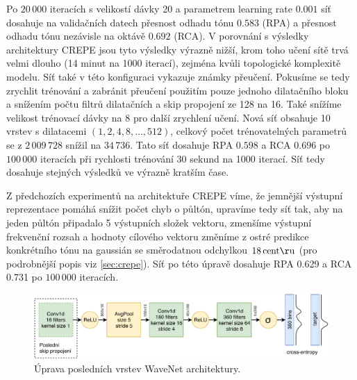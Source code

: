 Po $20\,000$ iteracích s velikostí dávky 20 a parametrem learning rate $0.001$ síť dosahuje na validačních datech přesnost odhadu tónu $0.583$ (RPA) a přesnost odhadu tónu nezávisle na oktávě $0.692$ (RCA). V porovnání s výsledky architektury CREPE jsou tyto výsledky výrazně nižší, krom toho učení sítě trvá velmi dlouho (14 minut na 1000 iterací), zejména kvůli topologické komplexitě modelu. Síť také v této konfiguraci vykazuje známky přeučení. Pokusíme se tedy zrychlit trénování a zabránit přeučení použitím pouze jednoho dilatačního bloku a snížením počtu filtrů dilatačních a skip propojení ze 128 na 16. Také snížíme velikost trénovací dávky na 8 pro další zrychlení učení. Nová síť obsahuje 10 vrstev s dilatacemi $(1, 2, 4, 8, \dots, 512)$, celkový počet trénovatelných parametrů se z $2\,009\,728$ snížil na $34\,736$. Tato síť dosahuje RPA $0.598$ a RCA $0.696$ po $100\,000$ iteracích při rychlosti trénování 30 sekund na 1000 iterací. Síť tedy dosahuje stejných výsledků ve výrazně kratším čase.

Z předchozích experimentů na architektuře CREPE víme, že jemnější výstupní reprezentace pomáhá snížit počet chyb o půltón, upravíme tedy síť tak, aby na jeden půltón připadalo 5 výstupních složek vektoru, zmenšíme výstupní frekvenční rozsah a hodnoty cílového vektoru změníme z ostré predikce konkrétního tónu na  gaussián se směrodatnou odchylkou $18\,\rm centů$ (pro podrobnější popis viz \ref{sec:crepe}). Síť po této úpravě dosahuje RPA 0.629 a RCA 0.731 po $100\,000$ iteracích. 

\begin{figure}[h]\centering
    \includegraphics[scale=0.8]{../img/wavenet_lastlayer}
    \caption{Úprava posledních vrstev WaveNet architektury.}\label{obr:wavenet_lastlayer}
\end{figure}

